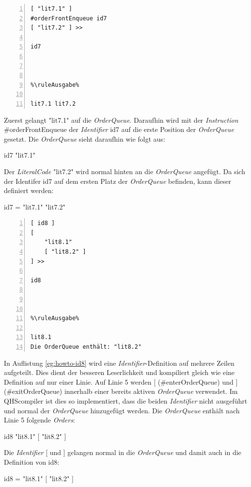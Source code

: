 \begin{minipage}{\linewidth}
\begin{multicols}{2}
\begin{lstlisting}[language=QHS, caption=Beispiel zu {\selectListingFont \#orderFrontEnqueue}, numbers=left, stepnumber=1]
%\ruleEingabe%
[ "lit7.1" ]
#orderFrontEnqueue id7
[ "lit7.2" ] >>

id7



%\ruleAusgabe%

lit7.1 lit7.2
\end{lstlisting}
\columnbreak
Zuerst gelangt {\selectListingFont "lit7.1"{}} auf die \textit{OrderQueue}.
Daraufhin wird mit der \textit{Instruction} {\selectListingFont \#orderFrontEnqueue} der \textit{Identifier} {\selectListingFont id7} auf die erste Position der \textit{OrderQueue} gesetzt.
Die \textit{OrderQueue} sieht daraufhin wie folgt aus:
\centerline{\selectListingFont id7 "lit7.1"{}}
Der \textit{LiteralCode} {\selectListingFont "lit7.2"{}} wird normal hinten an die \textit{OrderQueue} angefügt.
Da sich der Identifer {\selectListingFont id7} auf dem ersten Platz der \textit{OrderQueue} befinden, kann dieser definiert werden: \break
\centerline{\selectListingFont id7 = "lit7.1"{} "lit7.2"{}}
\end{multicols}
\end{minipage}
\vspace{\baselineskip}

\begin{minipage}{\linewidth}
\begin{multicols}{2}
\begin{lstlisting}[language=QHS, label=eg:howto-id8, caption=Beispiel zu doppelter Aktivierung der \textit{OrderQueue}, numbers=left, stepnumber=1]
%\ruleEingabe%
[ id8 ]
[
    "lit8.1"
    [ "lit8.2" ]
] >>

id8



%\ruleAusgabe%

lit8.1
Die OrderQueue enthält: "lit8.2"
\end{lstlisting}
\columnbreak
In Auflistung \ref{eg:howto-id8} wird eine \textit{Identifier}-Definition auf mehrere Zeilen aufgeteilt. Dies dient der besseren Leserlichkeit und kompiliert gleich wie eine Definition auf nur einer Linie.
Auf Linie 5 werden {\selectListingFont [} ({\selectListingFont \#enterOrderQueue}) und {\selectListingFont ]} ({\selectListingFont \#exitOrderQueue}) innerhalb einer bereits aktiven \textit{OrderQueue} verwendet.
Im QHScompiler ist dies so implementiert, dass die beiden \textit{Identifier} nicht ausgeführt und normal der \textit{OrderQueue} hinzugefügt werden. Die \textit{OrderQueue} enthält nach Linie 5 folgende \textit{Orders}: \break
\centerline{\selectListingFont id8 "lit8.1"{} [ "lit8.2"{} ] }
Die \textit{Identifier} {\selectListingFont [} und {\selectListingFont ]} gelangen normal in die \textit{OrderQueue} und damit auch in die Definition von {\selectListingFont id8}: \break
\centerline{\selectListingFont id8 = "lit8.1"{} [ "lit8.2"{} ] }
\end{multicols}
\end{minipage}
\vspace{\baselineskip}

